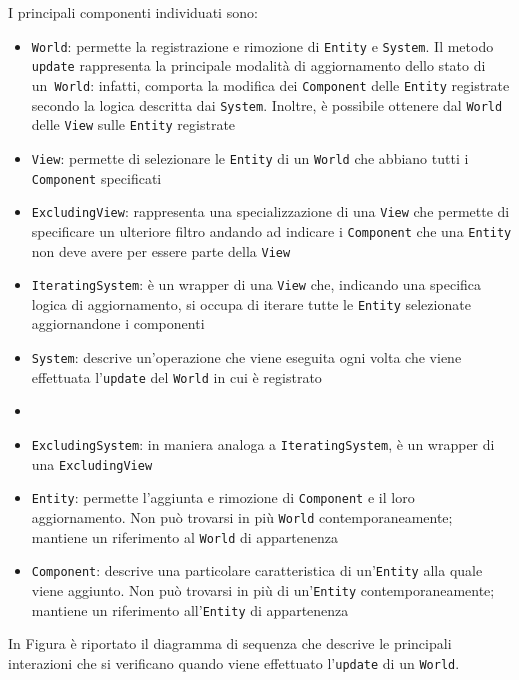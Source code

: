 I principali componenti individuati sono:
\begin{itemize}
    \item \texttt{World}: permette la registrazione e rimozione di \texttt{Entity} e \texttt{System}.
    Il metodo \texttt{update} rappresenta la principale modalità di aggiornamento dello stato di un~\texttt{World}: infatti, comporta la modifica dei \texttt{Component} delle \texttt{Entity} registrate secondo la logica descritta dai \texttt{System}.
    Inoltre, è possibile ottenere dal \texttt{World} delle \texttt{View} sulle \texttt{Entity} registrate
    \item \texttt{View}: permette di selezionare le \texttt{Entity} di un \texttt{World} che abbiano tutti i \texttt{Component} specificati
    \item \texttt{ExcludingView}: rappresenta una specializzazione di una \texttt{View} che permette di specificare un ulteriore filtro andando ad indicare i \texttt{Component} che una \texttt{Entity} non deve avere per essere parte della \texttt{View}
    \item \texttt{IteratingSystem}: è un wrapper di una \texttt{View} che, indicando una specifica logica di aggiornamento, si occupa di iterare tutte le \texttt{Entity} selezionate aggiornandone i componenti
    \item \texttt{System}: descrive un'operazione che viene eseguita ogni volta che viene effettuata l'\texttt{update} del \texttt{World} in cui è registrato
    \item \item \texttt{ExcludingSystem}: in maniera analoga a \texttt{IteratingSystem}, è un wrapper di una \texttt{ExcludingView}
    \item \texttt{Entity}: permette l'aggiunta e rimozione di \texttt{Component} e il loro aggiornamento.
    Non può trovarsi in più \texttt{World} contemporaneamente;
    mantiene un riferimento al \texttt{World} di appartenenza
    \item \texttt{Component}: descrive una particolare caratteristica di un'\texttt{Entity} alla quale viene aggiunto.
    Non può trovarsi in più di un'\texttt{Entity} contemporaneamente;
    mantiene un riferimento all'\texttt{Entity} di appartenenza
\end{itemize}

In Figura è riportato il diagramma di sequenza che descrive le principali interazioni che si verificano quando viene effettuato l'\texttt{update} di un \texttt{World}.

